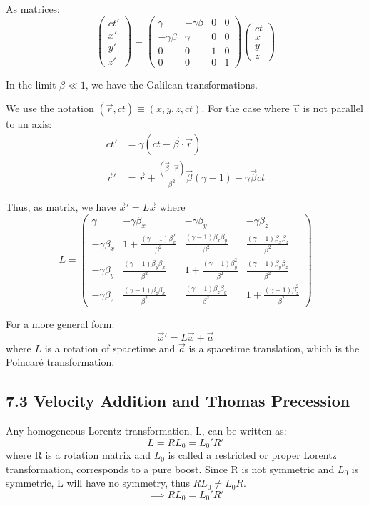 \documentclass{article}
\begin{document}
	As matrices:
	\[
	\begin{pmatrix} ct' \\ x' \\ y' \\ z' \end{pmatrix}
	=
	\begin{pmatrix}
		\gamma & -\gamma\beta & 0 & 0 \\
		-\gamma\beta & \gamma & 0 & 0 \\
		0 & 0 & 1 & 0 \\
		0 & 0 & 0 & 1
	\end{pmatrix}
	\begin{pmatrix} ct \\ x \\ y \\ z \end{pmatrix}
	\]
	
	In the limit $\beta \ll 1$, we have the Galilean transformations.
	
	We use the notation $(\vec{r}, ct) \equiv (x,y,z,ct)$. For the case where $\vec{v}$ is not parallel to an axis:
	\begin{align*}
		ct' &= \gamma(ct - \vec{\beta} \cdot \vec{r}) \\
		\vec{r}' &= \vec{r} + \frac{(\vec{\beta} \cdot \vec{r})}{\beta^2}\vec{\beta}(\gamma-1) - \gamma\vec{\beta}ct
	\end{align*}
	
	Thus, as matrix, we have $\vec{x}' = L\vec{x}$ where
	\[
	L =
	\begin{pmatrix}
		\gamma & -\gamma\beta_x & -\gamma\beta_y & -\gamma\beta_z \\
		-\gamma\beta_x & 1+\frac{(\gamma-1)\beta_x^2}{\beta^2} & \frac{(\gamma-1)\beta_x\beta_y}{\beta^2} & \frac{(\gamma-1)\beta_x\beta_z}{\beta^2} \\
		-\gamma\beta_y & \frac{(\gamma-1)\beta_y\beta_x}{\beta^2} & 1+\frac{(\gamma-1)\beta_y^2}{\beta^2} & \frac{(\gamma-1)\beta_y\beta_z}{\beta^2} \\
		-\gamma\beta_z & \frac{(\gamma-1)\beta_z\beta_x}{\beta^2} & \frac{(\gamma-1)\beta_z\beta_y}{\beta^2} & 1+\frac{(\gamma-1)\beta_z^2}{\beta^2}
	\end{pmatrix}
	\]
	
	For a more general form:
	\[ \vec{x}' = L\vec{x} + \vec{a} \]
	where $L$ is a rotation of spacetime and $\vec{a}$ is a spacetime translation, which is the Poincaré transformation.
	
	\subsection*{7.3 Velocity Addition and Thomas Precession}
	Any homogeneous Lorentz transformation, L, can be written as:
	\[ L = R L_0 = L_0' R' \]
	where R is a rotation matrix and $L_0$ is called a restricted or proper Lorentz transformation, corresponds to a pure boost.
	Since R is not symmetric and $L_0$ is symmetric, L will have no symmetry, thus $R L_0 \neq L_0 R$.
	\[ \implies R L_0 = L_0' R' \]
\end{document}
